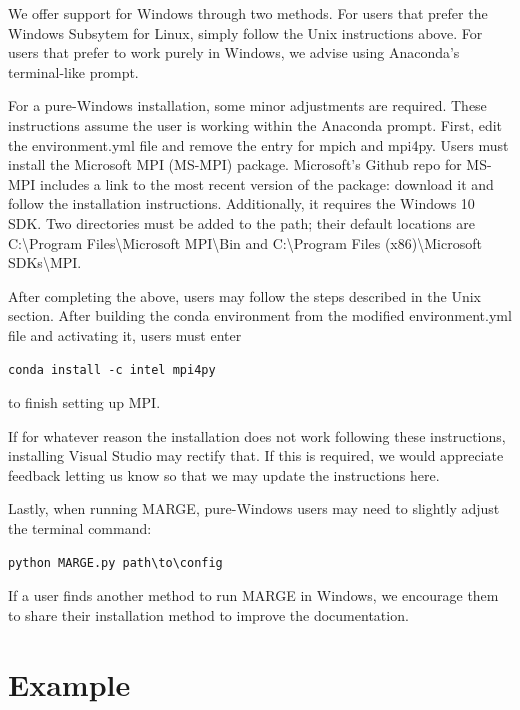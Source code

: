 \documentclass[letterpaper, 12pt]{article}
\begin{document}
\noindent We offer support for Windows through two methods.  For users that 
prefer the Windows Subsytem for Linux, simply follow the Unix instructions 
above.  For users that prefer to work purely in Windows, we advise using 
Anaconda's terminal-like prompt.\newline

\noindent For a pure-Windows installation, some minor adjustments are required.
These instructions assume the user is working within the Anaconda prompt.  
First, edit the environment.yml file and remove the entry for mpich and mpi4py. 
Users must install the Microsoft MPI (MS-MPI) package.  Microsoft's Github repo 
for MS-MPI includes a link to the most recent version of the package: download 
it and follow the installation instructions.  Additionally, it requires the 
Windows 10 SDK.  Two directories must be added to the path; their default 
locations are C:{\textbackslash}Program Files{\textbackslash}Microsoft MPI{\textbackslash}Bin and 
C:{\textbackslash}Program Files (x86){\textbackslash}Microsoft SDKs{\textbackslash}MPI. \newline

After completing the above, users may follow the steps described in the Unix 
section.  After building the conda environment from the modified environment.yml
file and activating it, users must enter
\begin{verbatim}
conda install -c intel mpi4py
\end{verbatim}
\noindent to finish setting up MPI.\newline

\noindent If for whatever reason the installation does not work following these 
instructions, installing Visual Studio may rectify that.  If this is required, 
we would appreciate feedback letting us know so that we may update the 
instructions here. \newline

\noindent Lastly, when running MARGE, pure-Windows users may need to slightly 
adjust the terminal command:
\begin{verbatim}
python MARGE.py path\to\config
\end{verbatim}

\noindent If a user finds another method to run MARGE 
in Windows, we encourage them to share their installation method to improve the 
documentation.


\section{Example}
\label{sec:example}
\end{document}
